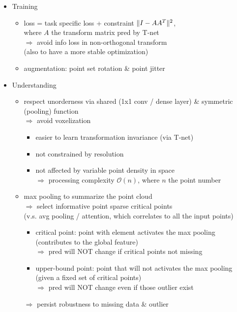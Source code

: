 \begin{itemize}
\begin{itemize}
	\item Training
		\begin{itemize}
		\item loss = task specific loss + constraint $\lVert I-AA^T\rVert^2$, \\
		where $A$ the transform matrix pred by T-net \\
		$\Rightarrow$ avoid info loss in non-orthogonal transform \\
		(also to have a more stable optimization)
		\item augmentation: point set rotation \& point jitter
		\end{itemize}
	\item Understanding
		\begin{itemize}
		\item respect unorderness via shared (1x1 conv / dense layer) \& symmetric (pooling) function \\
		$\Rightarrow$ avoid voxelization
			\begin{itemize}
			\item easier to learn transformation invariance (via T-net)
			\item not constrained by resolution
			\item not affected by variable point density in space \\
			$\Rightarrow$ processing complexity $\mathcal O(n)$, where $n$ the point number
			\end{itemize}
		\item max pooling to summarize the point cloud \\
		$\Rightarrow$ select informative point sparse critical points \\
		(v.s. avg pooling / attention, which correlates to all the input points)
			\begin{itemize}
			\item critical point: point with element activates the max pooling \\
			(contributes to the global feature) \\
			$\Rightarrow$ pred will NOT change if critical points not missing
			\item upper-bound point: point that will not activates the max pooling \\
			(given a fixed set of critical points) \\
			$\Rightarrow$ pred will NOT change even if those outlier exist
			\end{itemize}
		$\Rightarrow$ persist robustness to missing data \& outlier \\

\end{itemize}
\end{itemize}
\end{itemize}
